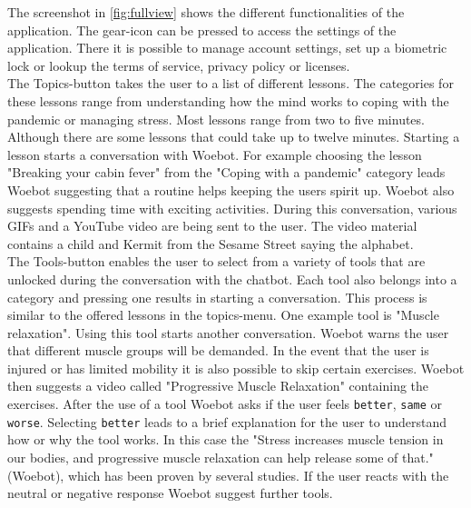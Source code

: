 The screenshot in \autoref{fig:fullview} shows the different functionalities of the application. The gear-icon can be pressed to access the settings of the application. There it is possible to manage account settings, set up a biometric lock or lookup the terms of service, privacy policy or licenses.\\

The Topics-button takes the user to a list of different lessons. The categories for these lessons range from understanding how the mind works to coping with the pandemic or managing stress. Most lessons range from two to five minutes. Although there are some lessons that could take up to twelve minutes. Starting a lesson starts a conversation with Woebot. For example choosing the lesson "Breaking your cabin fever" from the "Coping with a pandemic" category leads Woebot suggesting that a routine helps keeping the users spirit up. Woebot also suggests spending time with exciting activities. During this conversation, various GIFs and a YouTube video are being sent to the user. The video material contains a child and Kermit from the Sesame Street saying the alphabet. \\

The Tools-button enables the user to select from a variety of tools that are unlocked during the conversation with the chatbot. Each tool also belongs into a category and pressing one results in starting a conversation. This process is similar to the offered lessons in the topics-menu. One example tool is "Muscle relaxation". Using this tool starts another conversation. Woebot warns the user that different muscle groups will be demanded. In the event that the user is injured or has limited mobility it is also possible to skip certain exercises. Woebot then suggests a video called "Progressive Muscle Relaxation" containing the exercises. After the use of a tool Woebot asks if the user feels \texttt{better}, \texttt{same} or \texttt{worse}. Selecting \texttt{better} leads to a brief explanation for the user to understand how or why the tool works. In this case the "Stress increases muscle tension in our bodies, and progressive muscle relaxation can help release some of that." (Woebot), which has been proven by several studies\cite{progressive-muscle, stress-pmr}. If the user reacts with the neutral or negative response Woebot suggest further tools.



